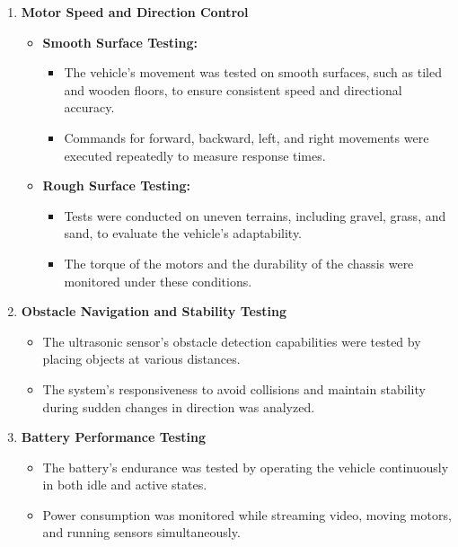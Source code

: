 \documentclass[12pt,a4paper]{report}
\begin{document}
\begin{enumerate}
        \item \textbf{Motor Speed and Direction Control}
    \begin{itemize}
        \item \textbf{Smooth Surface Testing:}
        \begin{itemize}
            \item The vehicle’s movement was tested on smooth surfaces, such as tiled and wooden floors, to ensure consistent speed and directional accuracy.
            \item Commands for forward, backward, left, and right movements were executed repeatedly to measure response times.
        \end{itemize}
        \item \textbf{Rough Surface Testing:}
        \begin{itemize}
            \item Tests were conducted on uneven terrains, including gravel, grass, and sand, to evaluate the vehicle’s adaptability.
            \item The torque of the motors and the durability of the chassis were monitored under these conditions.
        \end{itemize}
    \end{itemize}

    \item \textbf{Obstacle Navigation and Stability Testing}
    \begin{itemize}
        \item The ultrasonic sensor’s obstacle detection capabilities were tested by placing objects at various distances.
        \item The system's responsiveness to avoid collisions and maintain stability during sudden changes in direction was analyzed.
    \end{itemize}

    \item \textbf{Battery Performance Testing}
    \begin{itemize}
        \item The battery’s endurance was tested by operating the vehicle continuously in both idle and active states.
        \item Power consumption was monitored while streaming video, moving motors, and running sensors simultaneously.
    \end{itemize}
\end{enumerate}
\end{document}
